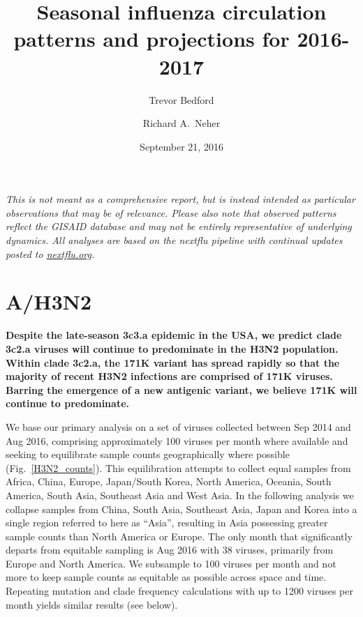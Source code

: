 \documentclass[11pt,oneside,letterpaper]{article}
\title{\vspace{2cm} \LARGE \bf
Seasonal influenza circulation patterns and projections for 2016-2017
}
\author[1]{Trevor Bedford}
\author[2]{Richard A.\ Neher}
\affil[1]{Vaccine and Infectious Disease Division, Fred Hutchinson Cancer Research Center, Seattle, WA, USA}
\affil[2]{Max Planck Institute for Developmental Biology, T\"ubingen, Germany}
\date{September 21, 2016}
\begin{document}
\maketitle

\textit{This is not meant as a comprehensive report, but is instead intended as particular observations that may be of relevance. Please also note that observed patterns reflect the GISAID database and may not be entirely representative of underlying dynamics. All analyses are based on the nextflu pipeline \cite{neher2015nextflu} with continual updates posted to \href{http://nextflu.org}{nextflu.org}.}

\tableofcontents

\pagebreak

\section*{A/H3N2}

\textbf{Despite the late-season 3c3.a epidemic in the USA, we predict clade 3c2.a viruses will continue to predominate in the H3N2 population. Within clade 3c2.a, the 171K variant has spread rapidly so that the majority of recent H3N2 infections are comprised of 171K viruses. Barring the emergence of a new antigenic variant, we believe 171K will continue to predominate.}

We base our primary analysis on a set of viruses collected between Sep 2014 and Aug 2016, comprising approximately 100 viruses per month where available and seeking to equilibrate sample counts geographically where possible (Fig.\ \ref{H3N2_counts}). This equilibration attempts to collect equal samples from Africa, China, Europe, Japan/South Korea, North America, Oceania, South America, South Asia, Southeast Asia and West Asia. In the following analysis we collapse samples from China, South Asia, Southeast Asia, Japan and Korea into a single region referred to here as ``Asia'', resulting in Asia possessing greater sample counts than North America or Europe. The only month that significantly departs from equitable sampling is Aug 2016 with 38 viruses, primarily from Europe and North America. We subsample to 100 viruses per month and not more to keep sample counts as equitable as possible across space and time. Repeating mutation and clade frequency calculations with up to 1200 viruses per month yields similar results (see below).
\end{document}
